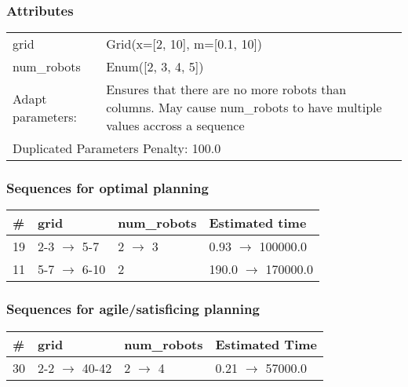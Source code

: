 \documentclass{article}
\begin{document}
                    \subsubsection*{Attributes}
                    \begin{tabular}{@{}p{}p{}@{}}
                    \toprule
                    grid & Grid(x=[2, 10], m=[0.1, 10])\\
num\_robots & Enum([2, 3, 4, 5])
                    \\\midrule
                    Adapt parameters: & Ensures that there are no more robots than columns. May cause num\_robots to have multiple values accross a sequence \\
                    \bottomrule
                    \multicolumn{2}{l}{Duplicated Parameters Penalty: 100.0}
                    \end{tabular}
                
                            \subsubsection*{Sequences for optimal planning}

                            \begin{center}
                            \begin{tabular}{@{}l|l|l|l@{}}
                            \# & grid & num\_robots & Estimated time\\\midrule
                            19&2-3 $\rightarrow$ 5-7&2 $\rightarrow$ 3&0.93 $\rightarrow$ 100000.0\\
11&5-7 $\rightarrow$ 6-10&2&190.0 $\rightarrow$ 170000.0
                            \end{tabular}
                            \end{center}
                    
                         \subsubsection*{Sequences for agile/satisficing planning}

                        \begin{center}
                        \begin{tabular}{@{}l|l|l|l@{}}
                        \# & grid & num\_robots & Estimated Time\\\midrule
                        30&2-2 $\rightarrow$ 40-42&2 $\rightarrow$ 4&0.21 $\rightarrow$ 57000.0
                        \end{tabular}
                        \end{center}
                    
\end{document}
